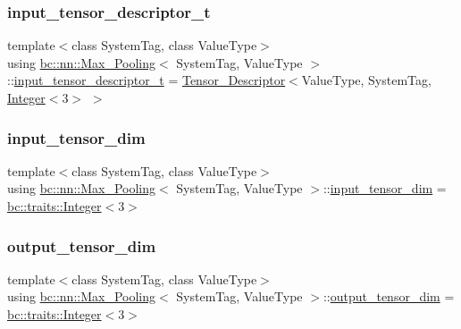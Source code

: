 \subsubsection{\texorpdfstring{input\+\_\+tensor\+\_\+descriptor\+\_\+t}{input\_tensor\_descriptor\_t}}
{\footnotesize\ttfamily template$<$class System\+Tag, class Value\+Type$>$ \\
using \hyperlink{structbc_1_1nn_1_1Max__Pooling}{bc\+::nn\+::\+Max\+\_\+\+Pooling}$<$ System\+Tag, Value\+Type $>$\+::\hyperlink{structbc_1_1nn_1_1Max__Pooling_aea291f6353c358b1f851b83f0787d782}{input\+\_\+tensor\+\_\+descriptor\+\_\+t} =  \hyperlink{structbc_1_1nn_1_1Tensor__Descriptor}{Tensor\+\_\+\+Descriptor}$<$Value\+Type, System\+Tag, \hyperlink{structbc_1_1traits_1_1Integer}{Integer}$<$3$>$ $>$}

\mbox{\label{structbc_1_1nn_1_1Max__Pooling_a32c0d4c35a7d36fc7381dd21f40372de}} 
\subsubsection{\texorpdfstring{input\+\_\+tensor\+\_\+dim}{input\_tensor\_dim}}
{\footnotesize\ttfamily template$<$class System\+Tag, class Value\+Type$>$ \\
using \hyperlink{structbc_1_1nn_1_1Max__Pooling}{bc\+::nn\+::\+Max\+\_\+\+Pooling}$<$ System\+Tag, Value\+Type $>$\+::\hyperlink{structbc_1_1nn_1_1Max__Pooling_a32c0d4c35a7d36fc7381dd21f40372de}{input\+\_\+tensor\+\_\+dim} =  \hyperlink{structbc_1_1traits_1_1Integer}{bc\+::traits\+::\+Integer}$<$3$>$}

\mbox{\label{structbc_1_1nn_1_1Max__Pooling_a2b2694a45b89f4d8d73781817f2fa9b1}} 
\subsubsection{\texorpdfstring{output\+\_\+tensor\+\_\+dim}{output\_tensor\_dim}}
{\footnotesize\ttfamily template$<$class System\+Tag, class Value\+Type$>$ \\
using \hyperlink{structbc_1_1nn_1_1Max__Pooling}{bc\+::nn\+::\+Max\+\_\+\+Pooling}$<$ System\+Tag, Value\+Type $>$\+::\hyperlink{structbc_1_1nn_1_1Max__Pooling_a2b2694a45b89f4d8d73781817f2fa9b1}{output\+\_\+tensor\+\_\+dim} =  \hyperlink{structbc_1_1traits_1_1Integer}{bc\+::traits\+::\+Integer}$<$3$>$}


